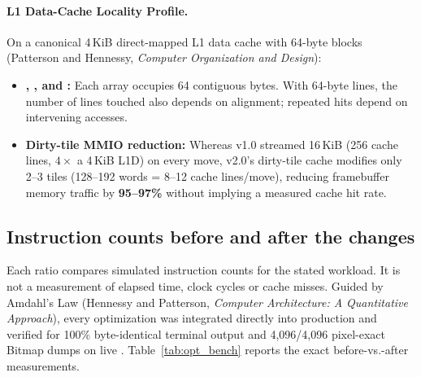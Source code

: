 \paragraph{L1 Data-Cache Locality Profile.}
On a canonical 4\,KiB direct-mapped L1 data cache with 64-byte blocks (Patterson and Hennessy, \emph{Computer Organization and Design}):
\begin{itemize}
    \item \textbf{, , and :} Each array occupies 64 contiguous bytes. With 64-byte lines, the number of lines touched also depends on alignment; repeated hits depend on intervening accesses.
    \item \textbf{Dirty-tile MMIO reduction:} Whereas v1.0 streamed 16\,KiB (256 cache lines, $4\times$ a 4\,KiB L1D) on every move, v2.0's dirty-tile cache modifies only 2--3 tiles (128--192 words = 8--12 cache lines/move), reducing framebuffer memory traffic by \textbf{95--97\%} without implying a measured cache hit rate.
\end{itemize}

\subsection{Instruction counts before and after the changes}
Each ratio compares simulated instruction counts for the stated workload. It is not a measurement of elapsed time, clock cycles or cache misses.
\label{sec:opt_prototypes}
Guided by Amdahl's Law (Hennessy and Patterson, \emph{Computer Architecture: A Quantitative Approach}), every optimization was integrated directly into production  and verified for 100\% byte-identical terminal output and 4,096/4,096 pixel-exact Bitmap dumps on live . Table~\ref{tab:opt_bench} reports the exact before-vs.-after measurements.

